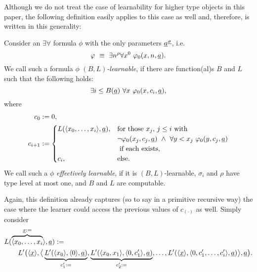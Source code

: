 % 
%
Although we do not treat the case of learnability for higher type objects 
in this paper, the following definition easily applies to this case as well 
and, therefore, is written in this generality:
\begin{dfn}
\label{d:fmcNum}
Consider an $\exists\forall$ formula $\phi$ with the only parameters $\underline a^{\underline \sigma}$, i.e.
\[\varphi\ \equiv\ \exists n^\rho \forall x^0\ \varphi_0(x,n,\underline a).\]
We call such a formula $\phi$ 
{\em $(B,L)$-learnable},
if there are function(al)s $B$ and $L$ such that the following holds:
\[ \exists i\leq B(\underline a)\ \forall x\ \varphi_0(x,c_i,\underline a),\] where
\begin{align*}
c_0&:=0,\\
c_{i+1}&:=
\begin{cases}
L(\langle x_0,\ldots,x_i\rangle, \tup a), &\text{for those $x_j$, $j\leq i$ with }\\
 &\neg\phi_0(x_j,c_j,\tup a)\ \wedge\ \forall y<x_j\ \phi_0(y,c_j,\tup a)\\
  &\text{ if each exists},\\
c_i, &\Telse.
\end{cases}
\end{align*}
We call such a $\phi$ {\em effectively learnable}, if it is $(B,L)$-learnable,
$\sigma_i$ and $\rho$ have type level at most one, and $B$ and $L$ are computable.
\end{dfn}
\newcommand{\seq}{_{(\cdot)}}
\begin{rmk}
Again, this definition already captures (so to say in a primitive recursive way) the case where the learner could access the previous values of $c\seq$ as well. Simply consider
\begin{align*}
&L(\overbrace{\langle x_0,\ldots,x_i}^{\underline x:=}\rangle, \underline a):=\\&\quad \quad
L'\big(\langle \underline x\rangle, \big\langle
 \underbrace{L'(\langle x_0\rangle, \langle 0\rangle,\underline a)}_{c'_1:=},
 \underbrace{L'(\langle x_0,x_1\rangle, \langle 0,c'_1\rangle,\underline a)}_{c'_2:=}, 
 \ldots,
 L'(\langle \underline x\rangle, \langle 0,c'_1,\ldots,c'_i\rangle,\underline a)
 \big\rangle, \underline a\big). 
\end{align*}
\end{rmk}

